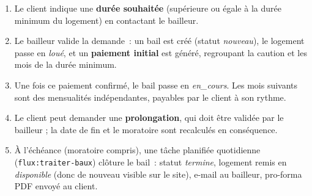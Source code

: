 \documentclass[11pt,a4paper]{report}
\newcommand{\tech}[1]{\texttt{\small #1}}
\begin{document}
\begin{center}
\end{center}

\begin{enumerate}[leftmargin=1.2cm]
    \item Le client indique une \textbf{durée souhaitée} (supérieure ou égale à la durée minimum du logement) en contactant le bailleur.
    \item Le bailleur valide la demande~: un bail est créé (statut \emph{nouveau}), le logement passe en \emph{loué}, et un \textbf{paiement initial} est généré, regroupant la caution et les mois de la durée minimum.
    \item Une fois ce paiement confirmé, le bail passe en \emph{en\_cours}. Les mois suivants sont des mensualités indépendantes, payables par le client à son rythme.
    \item Le client peut demander une \textbf{prolongation}, qui doit être validée par le bailleur ; la date de fin et le moratoire sont recalculés en conséquence.
    \item À l'échéance (moratoire compris), une tâche planifiée quotidienne (\tech{flux:traiter-baux}) clôture le bail~: statut \emph{termine}, logement remis en \emph{disponible} (donc de nouveau visible sur le site), e-mail au bailleur, pro-forma PDF envoyé au client.
\end{enumerate}
\end{document}
